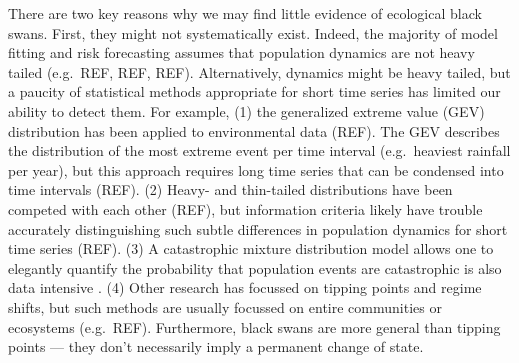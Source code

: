 There are two key reasons why we may find little evidence of ecological black
swans. First, they might not systematically exist. Indeed, the majority of
model fitting and risk forecasting assumes that population
dynamics are not heavy tailed (e.g.~REF, REF, REF).
Alternatively, dynamics might be heavy tailed, but a paucity of statistical
methods appropriate for short time series has limited our
ability to detect them.
For example, (1) the generalized extreme value (GEV) distribution has been
applied to environmental data (REF).
The GEV describes the distribution of the most extreme
event per time interval (e.g.~heaviest rainfall per year), but this approach
requires long time series that can be condensed into time intervals (REF).
(2) Heavy- and thin-tailed distributions have been competed with each
other (REF), but information criteria likely have
trouble accurately distinguishing such subtle differences in population
dynamics for short time series (REF).
(3) A catastrophic mixture distribution model allows one to elegantly quantify
the probability that population events are catastrophic is also data intensive
\citep{ward2007}.
(4) Other research has focussed on tipping points and regime shifts, but such
methods are usually focussed on entire communities or ecosystems (e.g.\ REF).
Furthermore, black swans are more general than tipping points --- they don't
necessarily imply a permanent change of state.


